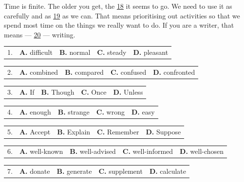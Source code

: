 \documentclass[UTF8,11pt]{ctexart}
\begin{document}
Time is finite. The older you get, the \uline{18} it seems to go. We need to use it as carefully and as \uline{19} as we can. That means prioritising out activities so that we spend most time on the things we really want to do. If you are a writer, that means — \uline{20} — writing.


\noindent\begin{tabularx}{\linewidth}{@{}lXXXX@{}}1. & \textbf{A.} difficult & \textbf{B.} normal & \textbf{C.} steady & \textbf{D.} pleasant\\\end{tabularx}\par

\noindent\begin{tabularx}{\linewidth}{@{}lXXXX@{}}2. & \textbf{A.} combined & \textbf{B.} compared & \textbf{C.} confused & \textbf{D.} confronted\\\end{tabularx}\par

\noindent\begin{tabularx}{\linewidth}{@{}lXXXX@{}}3. & \textbf{A.} If & \textbf{B.} Though & \textbf{C.} Once & \textbf{D.} Unless\\\end{tabularx}\par

\noindent\begin{tabularx}{\linewidth}{@{}lXXXX@{}}4. & \textbf{A.} enough & \textbf{B.} strange & \textbf{C.} wrong & \textbf{D.} easy\\\end{tabularx}\par

\noindent\begin{tabularx}{\linewidth}{@{}lXXXX@{}}5. & \textbf{A.} Accept & \textbf{B.} Explain & \textbf{C.} Remember & \textbf{D.} Suppose\\\end{tabularx}\par

\noindent\begin{tabularx}{\linewidth}{@{}lXXXX@{}}6. & \textbf{A.} well-known & \textbf{B.} well-advised & \textbf{C.} well-informed & \textbf{D.} well-chosen\\\end{tabularx}\par

\noindent\begin{tabularx}{\linewidth}{@{}lXXXX@{}}7. & \textbf{A.} donate & \textbf{B.} generate & \textbf{C.} supplement & \textbf{D.} calculate\\\end{tabularx}\par
\end{document}
